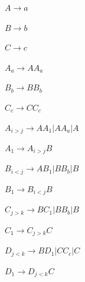 \documentclass{article}%
\begin{document}
\begin{enumerate}
\begin{enumerate}
	$A \rightarrow a$
	
	$B \rightarrow b$
	
	$C \rightarrow c$
	
	$A_a \rightarrow AA_a$
	
	$B_b \rightarrow BB_b$
	
	$C_c \rightarrow CC_c$
	
	$A_{i>j} \rightarrow AA_1 | AA_a | A$
	
	$A_1 \rightarrow A_{i>j}B$
	
	$B_{i<j} \rightarrow AB_1 | BB_b | B$
	
		$B_1 \rightarrow B_{i<j}B$
	
	$C_{j>k} \rightarrow BC_1 | BB_b | B$
	
	$C_1 \rightarrow C_{j>k}C$
	
	$D_{j<k} \rightarrow BD_1 | CC_c | C$
	
	$D_1 \rightarrow D_{j<k}C$\\
	
\end{enumerate}
	
\end{enumerate}
\end{document}
